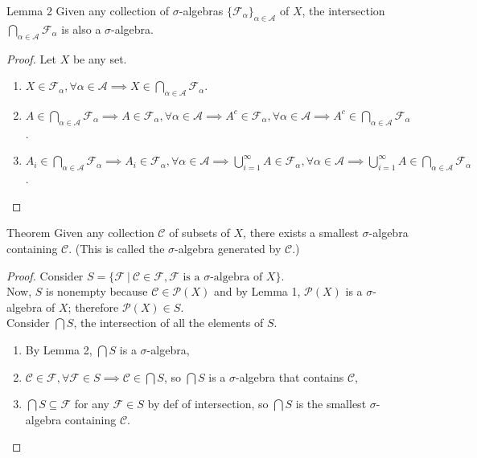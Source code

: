 \begin{flushleft}
	\begin{namedthm*}{Lemma 2}
		Given any collection of $\sigma$-algebras $\{\mathcal{F}_\alpha\}_{\alpha\in\mathcal{A}}$ of $X$, the intersection $\bigcap_{\alpha\in\mathcal{A}}\mathcal{F}_\alpha$ is also a $\sigma$-algebra.
	\end{namedthm*}
	\begin{proof}
		Let $X$ be any set.
		\begin{enumerate}[label=(\roman*),align=left]   
			\item $X\in\mathcal{F}_\alpha,\forall\alpha\in\mathcal{A}\implies X\in\bigcap_{\alpha\in\mathcal{A}}\mathcal{F}_\alpha$.
			\item $A\in\bigcap_{\alpha\in\mathcal{A}}\mathcal{F}_\alpha\implies A\in\mathcal{F}_\alpha,\forall\alpha\in\mathcal{A}\implies A^c\in\mathcal{F}_\alpha,\forall\alpha\in\mathcal{A}\implies A^c\in\bigcap_{\alpha\in\mathcal{A}}\mathcal{F}_\alpha$.
			\item $A_i\in\bigcap_{\alpha\in\mathcal{A}}\mathcal{F}_\alpha\implies A_i\in\mathcal{F}_\alpha,\forall\alpha\in\mathcal{A}\implies \bigcup_{i=1}^\infty A\in\mathcal{F}_\alpha,\forall\alpha\in\mathcal{A}\implies \bigcup_{i=1}^\infty A\in\bigcap_{\alpha\in\mathcal{A}}\mathcal{F}_\alpha$.
		\end{enumerate}
	\end{proof}

	\begin{namedthm*}{Theorem}
		Given any collection $\mathcal{C}$ of subsets of $X$, there exists a smallest $\sigma$-algebra containing $\mathcal{C}$.
		(This is called the $\sigma$-algebra generated by $\mathcal{C}$.)
	\end{namedthm*}
	\begin{proof}
		Consider $S=\{\mathcal{F}\ |\ \mathcal{C}\in\mathcal{F},\mathcal{F}\text{ is a }\sigma\text{-algebra of }X\}$.\\
		Now, $S$ is nonempty because $\mathcal{C}\in\mathcal{P}(X)$ and by Lemma 1, $\mathcal{P}(X)$ is a $\sigma$-algebra of $X$; therefore $\mathcal{P}(X)\in S$.\\
		Consider $\bigcap S$, the intersection of all the elements of $S$.\\
		\begin{enumerate}
			\item By Lemma 2, $\bigcap S$ is a $\sigma$-algebra,
			\item $\mathcal{C}\in\mathcal{F},\forall\mathcal{F}\in S\implies\mathcal{C}\in\bigcap S$, so $\bigcap S$ is a $\sigma$-algebra that contains $\mathcal{C}$,
			\item  $\bigcap S\subseteq \mathcal{F}$ for any $\mathcal{F}\in S$ by def of intersection, so $\bigcap S$ is the smallest $\sigma$-algebra containing $\mathcal{C}$.
		\end{enumerate}
	\end{proof}


\end{flushleft}
